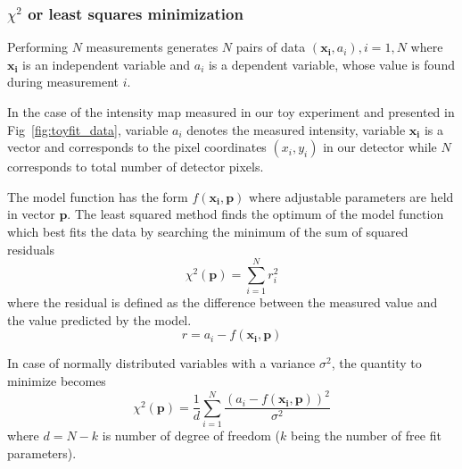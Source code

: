 \subsubsection*{$\chi^2$ or least squares minimization}
Performing $N$ measurements generates $N$ pairs of data $(\mathbf{x_{i}}, a_{i}), i=1,N$ where 
$\mathbf{x_{i}}$ is an independent variable and $a_{i}$ is a dependent variable, whose
value is found during measurement $i$.

In the case of the intensity map measured in our toy experiment 
and presented in Fig~\ref{fig:toyfit_data}, variable $a_{i}$ denotes
the measured intensity, variable $\mathbf{x_{i}}$ is a vector and
corresponds to the pixel coordinates $(x_{i}, y_{i})$ in our detector while $N$ corresponds 
to total number of detector pixels.

The model function has the form
$f(\mathbf{x_{i}},\mathbf{p})$
where adjustable parameters are held in vector $\mathbf{p}$.
The least squared method finds the optimum of the model function which best
fits the data by searching the minimum of the sum of squared
residuals
$$ \chi^{2}(\mathbf{p}) = \sum_{i=1}^{N}r_{i}^{2}$$
where the residual is defined as the difference between the measured value and the value predicted by the model.
$$r = a_{i} - f(\mathbf{x_{i}},\mathbf{p})$$

In case of normally distributed variables with a variance $\sigma^2$,
the quantity to minimize becomes
$$ \chi^{2}(\mathbf{p}) =
\frac{1}{d}
\sum_{i=1}^{N}  
\frac{ (a_{i} - f(\mathbf{x_{i}},\mathbf{p}))^2}{\sigma^2}   $$
where $d=N-k$ is number of degree of freedom ($k$ being the number of free fit parameters).

